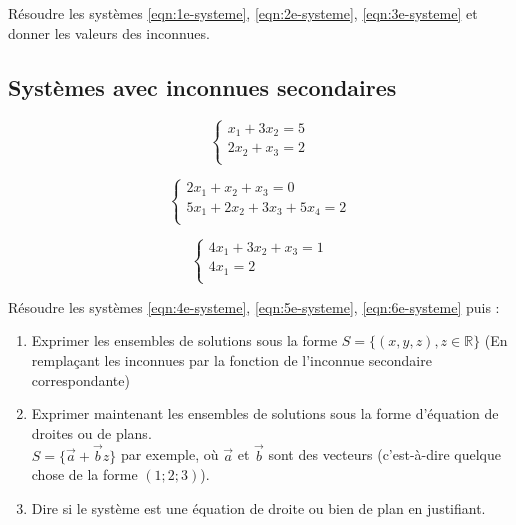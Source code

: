 \documentclass[a4paper]{article}\usepackage[]{graphicx}\usepackage[]{xcolor}
\newcommand{\R}{\mathbb{R}}
\begin{document}
Résoudre les systèmes \ref{eqn:1e-systeme}, \ref{eqn:2e-systeme}, \ref{eqn:3e-systeme} et donner les valeurs des inconnues.

\subsection*{Systèmes avec inconnues secondaires}
\begin{minipage}{0.33\linewidth}
    



\begin{equation}
    \begin{cases} x_1 + 3x_2  =  5 \\ 2x_2 + x_3  =  2 \\ \end{cases}
    \label{eqn:4e-systeme}
\end{equation}
\end{minipage}
\begin{minipage}{0.33\linewidth}


\begin{equation}
    \begin{cases} 2x_1 + x_2 + x_3  =  0 \\ 5x_1 + 2x_2 + 3x_3 + 5x_4  =  2 \\ \end{cases}
    \label{eqn:5e-systeme}
\end{equation}
\end{minipage}
\begin{minipage}{0.33\linewidth}


\begin{equation}
    \begin{cases} 4x_1 + 3x_2 + x_3  =  1 \\ 4x_1  =  2 \\ \end{cases}
    \label{eqn:6e-systeme}
\end{equation}
\end{minipage}

Résoudre les systèmes \ref{eqn:4e-systeme}, \ref{eqn:5e-systeme}, \ref{eqn:6e-systeme} puis :
\begin{enumerate}
    \item Exprimer les ensembles de solutions sous la forme $S = \{(x, y, z) , z \in \R\}$ 
    (En remplaçant les inconnues par la fonction de l'inconnue secondaire correspondante)
    \item Exprimer maintenant les ensembles de solutions sous la forme d'équation de droites ou de plans.\\
    $S = \{ \vec{a} + \vec{b} z \}$ par exemple, où $\vec{a}$ et $\vec{b}$ sont des vecteurs (c'est-à-dire quelque chose de la forme $(1;2;3)$).
    \item Dire si le système est une équation de droite ou bien de plan en justifiant.
\end{enumerate}
\end{document}
